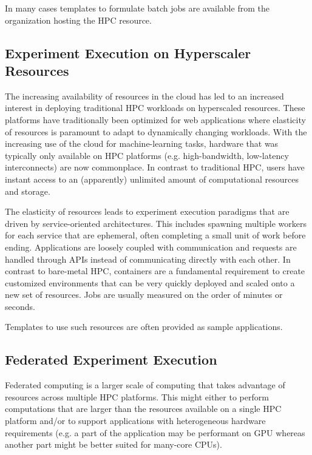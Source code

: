 In many cases templates to formulate batch jobs are available from the organization hosting the HPC resource.

\subsection{Experiment Execution on Hyperscaler Resources}

The increasing availability of resources in the cloud has led to an increased interest in deploying traditional HPC workloads on hyperscaled resources. These platforms have traditionally been optimized for web applications where elasticity of resources is paramount to adapt to dynamically changing workloads.  With the increasing use of the cloud for machine-learning tasks, hardware that was typically only available on HPC platforms (e.g. high-bandwidth, low-latency interconnects) are now commonplace. In contrast to traditional HPC, users have instant access to an (apparently) unlimited amount of computational resources and storage.

The elasticity of resources leads to experiment execution paradigms that are driven by service-oriented architectures. This includes spawning multiple workers for each service that are ephemeral, often completing a small unit of work before ending. Applications are loosely coupled with communication and requests are handled through APIs instead of communicating directly with each other.  In contrast to bare-metal HPC, containers are a fundamental requirement to create customized environments that can be very quickly deployed and scaled onto a new set of resources. Jobs are usually measured on the order of minutes or seconds.

Templates to use such resources are often provided as sample applications.

\subsection{Federated Experiment Execution}

Federated computing is a larger scale of computing that takes advantage of resources across multiple HPC platforms. This might either to perform computations that are larger than the resources available on a single HPC platform and/or to support applications with heterogeneous hardware requirements (e.g. a part of the application may be performant on GPU whereas another part might be better suited for many-core CPUs). 

